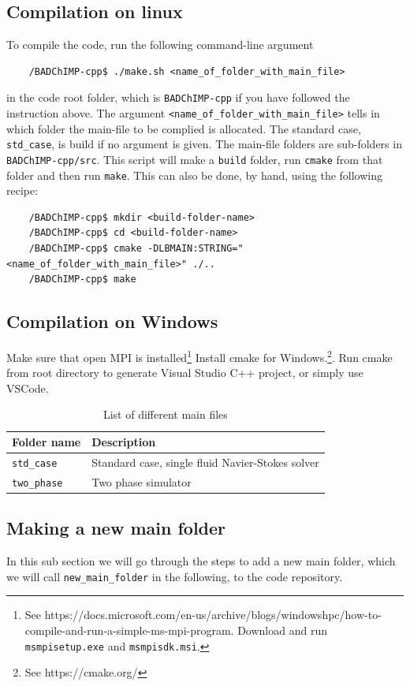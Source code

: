 \documentclass[11pt,a4paper]{report}
\begin{document}
\subsection{Compilation on linux} To compile the code, run the following command-line argument
\begin{verbatim}
    /BADChIMP-cpp$ ./make.sh <name_of_folder_with_main_file>
\end{verbatim}
in the code root folder, which is \texttt{BADChIMP-cpp} if you have followed the instruction above. The argument \texttt{<name{\_}of{\_}folder{\_}with{\_}main{\_}file>} tells in which folder the main-file to be complied is allocated. The standard case, \texttt{std{\_}case}, is build if no argument is given. The main-file folders are sub-folders in \texttt{BADChIMP-cpp/src}. This script will make a \texttt{build} folder, run \texttt{cmake} from that folder and then run \texttt{make}. 
This can also be done, by hand, using the following recipe: 
\begin{verbatim}
    /BADChIMP-cpp$ mkdir <build-folder-name>
    /BADChIMP-cpp$ cd <build-folder-name>
    /BADChIMP-cpp$ cmake -DLBMAIN:STRING="<name_of_folder_with_main_file>" ./..
    /BADChIMP-cpp$ make
\end{verbatim}

\subsection{Compilation on Windows} 
Make sure that open MPI is installed\footnote{See https://docs.microsoft.com/en-us/archive/blogs/windowshpc/how-to-compile-and-run-a-simple-ms-mpi-program. Download and run \texttt{msmpisetup.exe} and \texttt{msmpisdk.msi}.}  Install cmake for Windows.\footnote{See https://cmake.org/}. Run cmake from root directory to generate Visual Studio C++ project, or simply use VSCode.
\begin{table}
	\begin{tabular}{|l|l|}\hline
		Folder name & Description \\ \hline
		\texttt{std{\_}case} & Standard case, single fluid Navier-Stokes solver \\ \hline
		\texttt{two{\_}phase} & Two phase simulator \\ \hline
    \end{tabular}
	\caption{List of different main files}
\end{table}

\subsection{Making a new main folder}
In this sub section we will go through the steps to add a new main folder, which we will call \texttt{new{\_}main{\_}folder} in the following, to the code repository.
\end{document}
